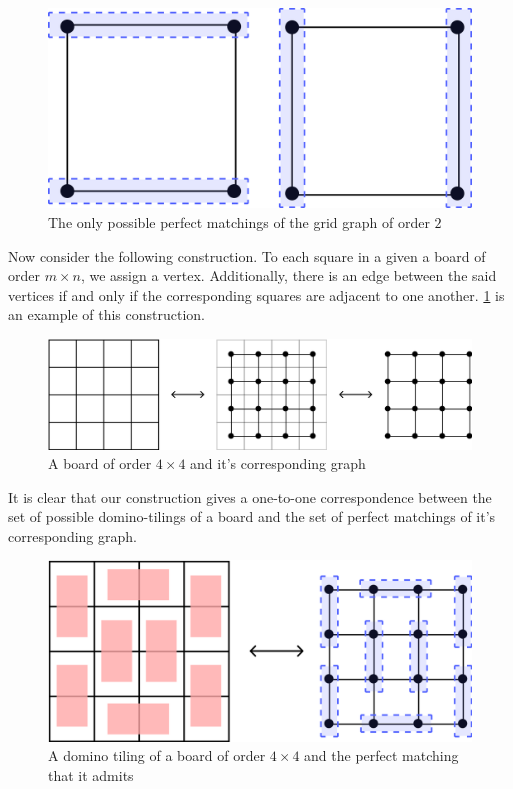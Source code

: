 \begin{figure}[H]
	\centering
	\includegraphics[scale=0.6]{Images/Figure2.jpg}
	\caption{The only possible perfect matchings of the grid graph of order $2$}
\end{figure}
Now consider the following construction. To each square in a given a board of order $m\times n$, we assign a vertex. Additionally, there is an edge between the said vertices if and only if the corresponding squares are adjacent to one another. \cref{f:1.3} is an example of this construction. 

\begin{figure}[H]
	\centering
	\includegraphics[scale=0.6]{Images/Figure3.jpg}
	\caption{A board of order $4\times 4$ and it's corresponding graph}
	\label{f:1.3}
\end{figure}

It is clear that our construction gives a one-to-one correspondence between the set of possible domino-tilings of a board and the set of perfect matchings of it's corresponding graph.

\begin{figure}[H]
	\centering
	\includegraphics[scale=0.6]{Images/Figure4.png}
	\caption{A domino tiling of a board of order $4\times 4$ and the perfect matching that it admits}
\end{figure}

